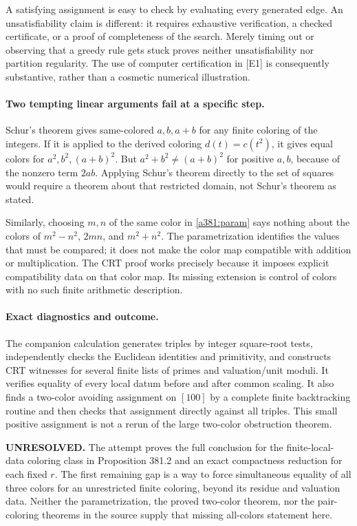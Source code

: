 \documentclass[11pt]{article}
\begin{document}
A satisfying assignment is easy to check by evaluating every generated edge. An unsatisfiability claim is different: it requires exhaustive verification, a checked certificate, or a proof of completeness of the search. Merely timing out or observing that a greedy rule gets stuck proves neither unsatisfiability nor partition regularity. The use of computer certification in [E1] is consequently substantive, rather than a cosmetic numerical illustration.

\paragraph{Two tempting linear arguments fail at a specific step.}
Schur's theorem gives same-colored $a,b,a+b$ for any finite coloring of the integers. If it is applied to the derived coloring $d(t)=c(t^2)$, it gives equal colors for $a^2,b^2,(a+b)^2$. But $a^2+b^2\ne(a+b)^2$ for positive $a,b$, because of the nonzero term $2ab$. Applying Schur's theorem directly to the set of squares would require a theorem about that restricted domain, not Schur's theorem as stated.

Similarly, choosing $m,n$ of the same color in \eqref{a381:param} says nothing about the colors of $m^2-n^2$, $2mn$, and $m^2+n^2$. The parametrization identifies the values that must be compared; it does not make the color map compatible with addition or multiplication. The CRT proof works precisely because it imposes explicit compatibility data on that color map. Its missing extension is control of colors with no such finite arithmetic description.

\paragraph{Exact diagnostics and outcome.}
The companion calculation generates triples by integer square-root tests, independently checks the Euclidean identities and primitivity, and constructs CRT witnesses for several finite lists of primes and valuation/unit moduli. It verifies equality of every local datum before and after common scaling. It also finds a two-color avoiding assignment on $[100]$ by a complete finite backtracking routine and then checks that assignment directly against all triples. This small positive assignment is not a rerun of the large two-color obstruction theorem.

\textbf{UNRESOLVED.} The attempt proves the full conclusion for the finite-local-data coloring class in Proposition 381.2 and an exact compactness reduction for each fixed $r$. The first remaining gap is a way to force simultaneous equality of all three colors for an unrestricted finite coloring, beyond its residue and valuation data. Neither the parametrization, the proved two-color theorem, nor the pair-coloring theorems in the source supply that missing all-colors statement here.
\end{document}
